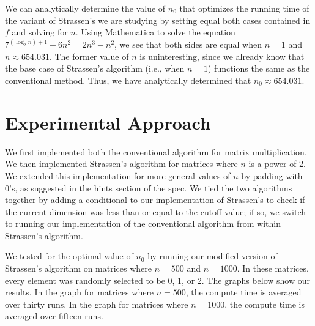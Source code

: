\documentclass[solution, letterpaper]{cs121}
\begin{document}
We can analytically determine the value of $n_0$ that optimizes the running time of the variant of Strassen's we are studying by setting equal both cases contained in $f$ and solving for $n$. Using Mathematica to solve the equation $7^{(\log_2 n) + 1}-6 n^2 = 2n^3 - n^2$, we see that both sides are equal when $n = 1$ and $n \approx 654.031$. The former value of $n$ is uninteresting, since we already know that the base case of Strassen's algorithm (i.e., when $n=1$) functions the same as the conventional method. Thus, we have analytically determined that $n_0 \approx 654.031$.

\section*{Experimental Approach}

\hspace{4mm}We first implemented both the conventional algorithm for matrix multiplication. We then implemented Strassen's algorithm for matrices where $n$ is a power of 2. We extended this implementation for more general values of $n$ by padding with 0's, as suggested in the hints section of the spec. We tied the two algorithms together by adding a conditional to our implementation of Strassen's to check if the current dimension was less than or equal to the cutoff value; if so, we switch to running our implementation of the conventional algorithm from within Strassen's algorithm. 

We tested for the optimal value of $n_0$ by running our modified version of Strassen's algorithm on matrices where $n=500$ and $n=1000$. In these matrices, every element was randomly selected to be 0, 1, or 2. The graphs below show our results. In the graph for matrices where $n=500$, the compute time is averaged over thirty runs. In the graph for matrices where $n=1000$, the compute time is averaged over fifteen runs.
\end{document}
